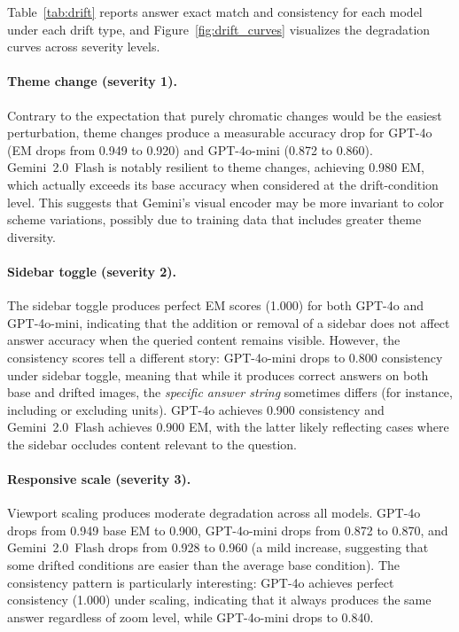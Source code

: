 Table~\ref{tab:drift} reports answer exact match and consistency for each model under each drift type, and Figure~\ref{fig:drift_curves} visualizes the degradation curves across severity levels.

\paragraph{Theme change (severity 1).}
Contrary to the expectation that purely chromatic changes would be the easiest perturbation, theme changes produce a measurable accuracy drop for GPT-4o (EM drops from 0.949 to 0.920) and GPT-4o-mini (0.872 to 0.860). Gemini~2.0~Flash is notably resilient to theme changes, achieving 0.980 EM, which actually exceeds its base accuracy when considered at the drift-condition level. This suggests that Gemini's visual encoder may be more invariant to color scheme variations, possibly due to training data that includes greater theme diversity.

\paragraph{Sidebar toggle (severity 2).}
The sidebar toggle produces perfect EM scores (1.000) for both GPT-4o and GPT-4o-mini, indicating that the addition or removal of a sidebar does not affect answer accuracy when the queried content remains visible. However, the consistency scores tell a different story: GPT-4o-mini drops to 0.800 consistency under sidebar toggle, meaning that while it produces correct answers on both base and drifted images, the \emph{specific answer string} sometimes differs (for instance, including or excluding units). GPT-4o achieves 0.900 consistency and Gemini~2.0~Flash achieves 0.900 EM, with the latter likely reflecting cases where the sidebar occludes content relevant to the question.

\paragraph{Responsive scale (severity 3).}
Viewport scaling produces moderate degradation across all models. GPT-4o drops from 0.949 base EM to 0.900, GPT-4o-mini drops from 0.872 to 0.870, and Gemini~2.0~Flash drops from 0.928 to 0.960 (a mild increase, suggesting that some drifted conditions are easier than the average base condition). The consistency pattern is particularly interesting: GPT-4o achieves perfect consistency (1.000) under scaling, indicating that it always produces the same answer regardless of zoom level, while GPT-4o-mini drops to 0.840.

